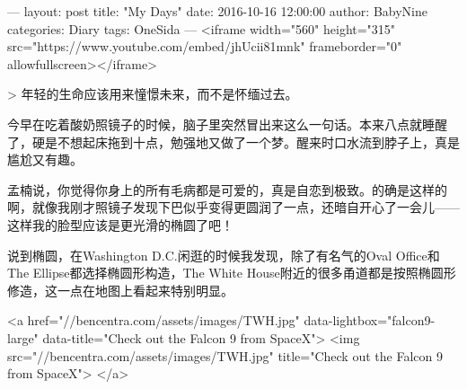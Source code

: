 ---
layout: post
title: "My Days"
date: 2016-10-16 12:00:00
author: BabyNine
categories: Diary
tags: OneSida
---
<iframe width="560" height="315" src="https://www.youtube.com/embed/jhUcii81mnk" frameborder="0" allowfullscreen></iframe>

> 年轻的生命应该用来憧憬未来，而不是怀缅过去。

今早在吃着酸奶照镜子的时候，脑子里突然冒出来这么一句话。本来八点就睡醒了，硬是不想起床拖到十点，勉强地又做了一个梦。醒来时口水流到脖子上，真是尴尬又有趣。

孟楠说，你觉得你身上的所有毛病都是可爱的，真是自恋到极致。的确是这样的啊，就像我刚才照镜子发现下巴似乎变得更圆润了一点，还暗自开心了一会儿——这样我的脸型应该是更光滑的椭圆了吧！

说到椭圆，在Washington D.C.闲逛的时候我发现，除了有名气的Oval Office和The Ellipse都选择椭圆形构造，The White House附近的很多甬道都是按照椭圆形修造，这一点在地图上看起来特别明显。

<a href="//bencentra.com/assets/images/TWH.jpg" data-lightbox="falcon9-large" data-title="Check out the Falcon 9 from SpaceX">
<img src="//bencentra.com/assets/images/TWH.jpg" title="Check out the Falcon 9 from SpaceX">
</a>
